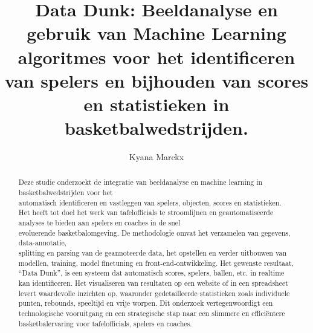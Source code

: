 \documentclass{hogent-article}
\title{Data Dunk: Beeldanalyse en gebruik van Machine Learning algoritmes voor het identificeren van spelers en bijhouden van scores en statistieken in \\basketbalwedstrijden.}
\author{Kyana Marckx}
\begin{document}
\begin{abstract}
  
  Deze studie onderzoekt de integratie van beeldanalyse en machine learning in basketbalwedstrijden voor het \\automatisch identificeren en vastleggen van spelers, objecten, scores en statistieken. Het heeft tot doel het werk van tafelofficials te stroomlijnen en geautomatiseerde analyses te bieden aan spelers en coaches in de snel \\evoluerende basketbalomgeving. De methodologie omvat het verzamelen van gegevens, data-annotatie, \\splitting en parsing van de geannoteerde data, het opstellen en verder uitbouwen van modellen, training, model finetuning en front-end-ontwikkeling. Het gewenste resultaat, ``Data Dunk'', is een systeem dat  automatisch scores, spelers, ballen, etc. in realtime kan identificeren. Het visualiseren van resultaten op een website of in een spreadsheet levert waardevolle inzichten op, waaronder gedetailleerde statistieken zoals individuele punten, rebounds, speeltijd en vrije worpen. Dit onderzoek vertegenwoordigt een technologische vooruitgang en een strategische stap naar een slimmere en efficiëntere basketbalervaring voor tafelofficials, spelers en coaches.
\end{abstract}

\tableofcontents




%
%
\printbibliography[heading=bibintoc]
\end{document}
